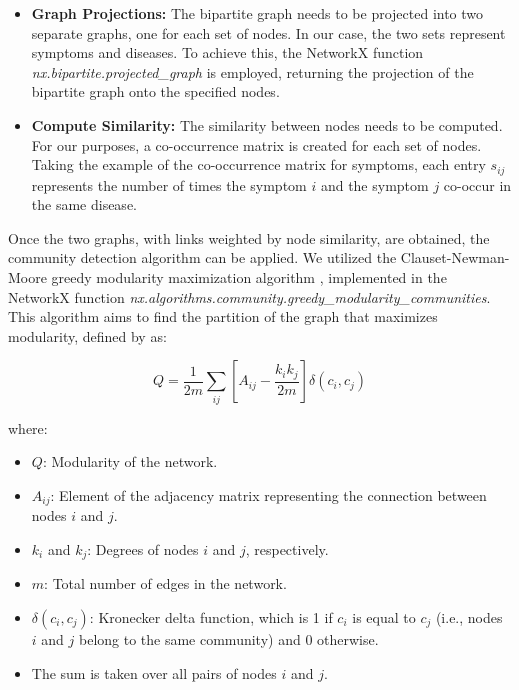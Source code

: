 \begin{itemize}
    \setlength\itemsep{1em} %
    \item \textbf{Graph Projections:} The bipartite graph needs to be projected into two separate graphs,
          one for each set of nodes. In our case, the two sets represent symptoms and diseases. To achieve this,
          the NetworkX function \textit{nx.bipartite.projected\_graph} is employed, returning the projection of
          the bipartite graph onto the specified nodes.

    \item \textbf{Compute Similarity:} The similarity between nodes needs to be computed. For our purposes,
          a co-occurrence matrix is created for each set of nodes. Taking the example of the co-occurrence matrix
          for symptoms, each entry \(s_{ij}\) represents the number of times the symptom \(i\) and the symptom \(j\)
          co-occur in the same disease.
\end{itemize}

Once the two graphs, with links weighted by node similarity, are obtained, the community detection algorithm
can be applied. We utilized the Clauset-Newman-Moore greedy modularity maximization algorithm \cite{Clauset_Newman_Moore_2004},
implemented in the NetworkX function \textit{nx.algorithms.community.greedy\_modularity\_communities}. This algorithm aims to
find the partition of the graph that maximizes modularity, defined by  \cite{Newman_2006} as:

\begin{equation}
    Q = \frac{1}{2m} \sum_{ij} \left[A_{ij} - \frac{k_i k_j}{2m}\right] \delta(c_i, c_j) \label{eq:modularity}
\end{equation}

where:

\begin{itemize}
    \setlength\itemsep{0.4em} %
    \item \(Q\): Modularity of the network.
    \item \(A_{ij}\): Element of the adjacency matrix representing the connection between nodes \(i\) and \(j\).
    \item \(k_i\) and \(k_j\): Degrees of nodes \(i\) and \(j\), respectively.
    \item \(m\): Total number of edges in the network.
    \item \(\delta(c_i, c_j)\): Kronecker delta function, which is 1 if \(c_i\) is equal to \(c_j\) (i.e., nodes \(i\)
          and \(j\) belong to the same community) and 0 otherwise.
    \item The sum is taken over all pairs of nodes \(i\) and \(j\).
\end{itemize}






